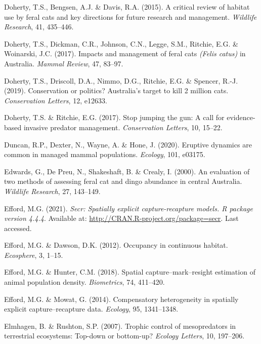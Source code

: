 \documentclass[11pt,a4paper,titlepage,twoside,openright]{style/unimelbthesis}
\begin{document}
\begin{mainmatter}
\leavevmode\hypertarget{ref-doherty2015critical}{}%
Doherty, T.S., Bengsen, A.J. \& Davis, R.A. (2015). A critical review of habitat use by feral cats and key directions for future research and management. \emph{Wildlife Research}, 41, 435--446.

\leavevmode\hypertarget{ref-doherty2017impacts}{}%
Doherty, T.S., Dickman, C.R., Johnson, C.N., Legge, S.M., Ritchie, E.G. \& Woinarski, J.C. (2017). Impacts and management of feral cats \emph{(Felis catus)} in Australia. \emph{Mammal Review}, 47, 83--97.

\leavevmode\hypertarget{ref-doherty2019conservation}{}%
Doherty, T.S., Driscoll, D.A., Nimmo, D.G., Ritchie, E.G. \& Spencer, R.-J. (2019). Conservation or politics? Australia's target to kill 2 million cats. \emph{Conservation Letters}, 12, e12633.

\leavevmode\hypertarget{ref-doherty2017stop}{}%
Doherty, T.S. \& Ritchie, E.G. (2017). Stop jumping the gun: A call for evidence-based invasive predator management. \emph{Conservation Letters}, 10, 15--22.

\leavevmode\hypertarget{ref-duncan2020eruptive}{}%
Duncan, R.P., Dexter, N., Wayne, A. \& Hone, J. (2020). Eruptive dynamics are common in managed mammal populations. \emph{Ecology}, 101, e03175.

\leavevmode\hypertarget{ref-edwards2000evaluation}{}%
Edwards, G., De Preu, N., Shakeshaft, B. \& Crealy, I. (2000). An evaluation of two methods of assessing feral cat and dingo abundance in central Australia. \emph{Wildlife Research}, 27, 143--149.

\leavevmode\hypertarget{ref-efford2021secr}{}%
Efford, M.G. (2021). \emph{Secr: Spatially explicit capture-recapture models. R package version 4.4.4}. Available at: \url{http://CRAN.R-project.org/package=secr}. Last accessed.

\leavevmode\hypertarget{ref-efford2012occupancy}{}%
Efford, M.G. \& Dawson, D.K. (2012). Occupancy in continuous habitat. \emph{Ecosphere}, 3, 1--15.

\leavevmode\hypertarget{ref-efford2018spatial}{}%
Efford, M.G. \& Hunter, C.M. (2018). Spatial capture--mark--resight estimation of animal population density. \emph{Biometrics}, 74, 411--420.

\leavevmode\hypertarget{ref-efford2014compensatory}{}%
Efford, M.G. \& Mowat, G. (2014). Compensatory heterogeneity in spatially explicit capture--recapture data. \emph{Ecology}, 95, 1341--1348.

\leavevmode\hypertarget{ref-elmhagen2007trophic}{}%
Elmhagen, B. \& Rushton, S.P. (2007). Trophic control of mesopredators in terrestrial ecosystems: Top-down or bottom-up? \emph{Ecology Letters}, 10, 197--206.


\end{mainmatter}
\end{document}
